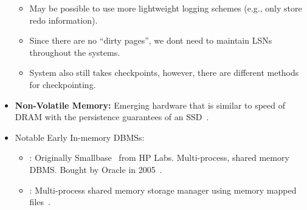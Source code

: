 \documentclass[11pt]{article}
\begin{document}
\begin{itemize}
\begin{itemize}
        \item
        May be possible to use more lightweight logging schemes (e.g., only store redo 
        information).
        
        \item
        Since there are no ``dirty pages'', we dont need to maintain LSNs throughout the systems.
        
        \item
        System also still takes checkpoints, however, there are different methods for 
        checkpointing.
    \end{itemize}
    
    \item
    \textbf{Non-Volatile Memory:}
    Emerging hardware that is similar to speed of DRAM with the 
    persistence guarantees of an SSD~\cite{arulraj15}.
    
    \item Notable Early In-memory DBMSs:
    \begin{itemize}
        \item
        : Originally Smallbase~\cite{heytens95} from HP Labs.
        Multi-process, shared memory DBMS.
        Bought by Oracle in 2005~\cite{lahiri13}.
        
        \item
        : Multi-process shared memory storage manager using memory mapped 
        files~\cite{Dali}.
    \end{itemize}
\end{itemize}

\newpage


\end{document}
